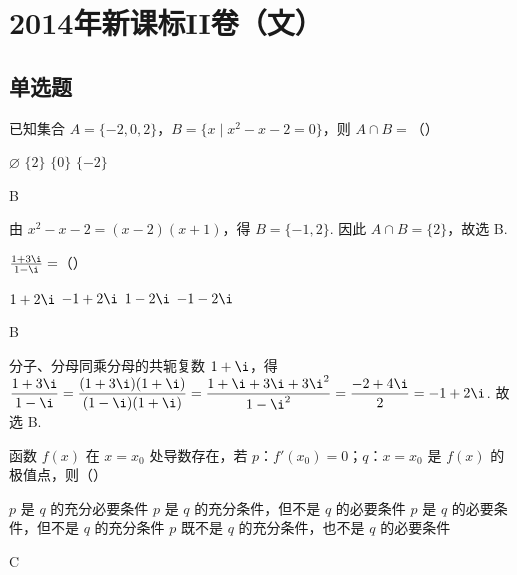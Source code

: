 \chapter{2014年新课标II卷（文）}

\section{单选题}

\begin{problem}
已知集合 \(A=\{-2,0,2\}\)，\(B=\{x\mid x^2-x-2=0\}\)，则 \(A\cap B=\)（\quad）

\choices
    {\(\varnothing\)}
    {\(\{2\}\)}
    {\(\{0\}\)}
    {\(\{-2\}\)}
\end{problem}

\begin{answer}
B
\end{answer}

\begin{solution}
由 \(x^2-x-2=(x-2)(x+1)\)，得 \(B=\{-1,2\}\). 因此 \(A\cap B=\{2\}\)，故选 B.
\end{solution}

\begin{problem}
\(\frac{1+3\i}{1-\i}=\)（\quad）

\choices
    {\(1+2\i\)}
    {\(-1+2\i\)}
    {\(1-2\i\)}
    {\(-1-2\i\)}
\end{problem}

\begin{answer}
B
\end{answer}

\begin{solution}
分子、分母同乘分母的共轭复数 \(1+\i\)，得
\(\displaystyle\frac{1+3\i}{1-\i}=\frac{(1+3\i)(1+\i)}{(1-\i)(1+\i)}=\frac{1+\i+3\i+3\i^2}{1-\i^2}=\frac{-2+4\i}{2}=-1+2\i\). 故选 B.
\end{solution}

\begin{problem}
函数 \(f(x)\) 在 \(x=x_0\) 处导数存在，若 \(p\)：\(f'(x_0)=0\)；\(q\)：\(x=x_0\) 是 \(f(x)\) 的极值点，则（\quad）

\choices
    {\(p\) 是 \(q\) 的充分必要条件}
    {\(p\) 是 \(q\) 的充分条件，但不是 \(q\) 的必要条件}
    {\(p\) 是 \(q\) 的必要条件，但不是 \(q\) 的充分条件}
    {\(p\) 既不是 \(q\) 的充分条件，也不是 \(q\) 的必要条件}
\end{problem}

\begin{answer}
C
\end{answer}

